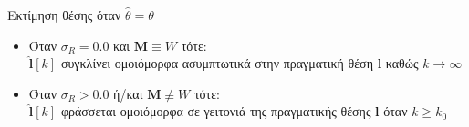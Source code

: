 \begin{frame}{Εκτίμηση θέσης όταν $\hat{\theta} = \theta$}

  \vspace{1cm}


  \begin{itemize}
    \item Όταν $\sigma_R = 0.0$ και $\bm{M}\equiv W$ τότε: \\
          $\hat{\bm{l}}[k]$ συγκλίνει ομοιόμορφα ασυμπτωτικά στην πραγματική θέση $\bm{l}$ καθώς $k \rightarrow \infty$ \vspace{0.25cm}
    \item Όταν $\sigma_R > 0.0$ ή/και $\bm{M} \not\equiv W$ τότε: \\
          $\hat{\bm{l}}[k]$ φράσσεται ομοιόμορφα σε γειτονιά της πραγματικής θέσης $\bm{l}$ όταν $k \geq k_0$
  \end{itemize}


\end{frame}
